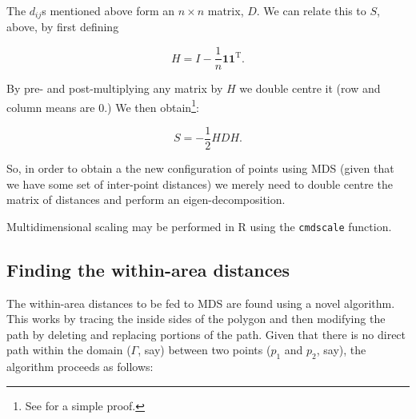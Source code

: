 \documentclass[a4paper,10pt]{amsart}
\newcommand{\tr}[1]{#1^{\text{T}}}
\begin{document}
The $d_{ij}$s mentioned above form an $n \times n$ matrix, $D$. We can relate this to $S$, above, by first defining

\begin{equation}
H = I-\frac{1}{n}\mathbf{1}\tr{\mathbf{1}}.
\end{equation}

By pre- and post-multiplying any matrix by $H$ we double centre it (row and column means are 0.) We then obtain\footnote{See \cite{diaconis08} for a simple proof.}:

\begin{equation}
S = -\frac{1}{2}HDH.
\end{equation}

So, in order to obtain a the new configuration of points using MDS (given that we have some set of inter-point distances) we merely need to double centre the matrix of distances and perform an eigen-decomposition.

Multidimensional scaling may be performed in \textsf{R} using the \texttt{cmdscale} function. 






\subsection{Finding the within-area distances}

The within-area distances to be fed to MDS are found using a novel algorithm. This works by tracing the inside sides of the polygon and then modifying the path by deleting and replacing portions of the path. Given that there is no direct path within the domain ($\Gamma$, say) between two points ($p_1$ and $p_2$, say), the algorithm proceeds as follows:
\end{document}
